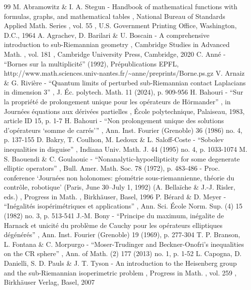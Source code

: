 \documentclass[11pt]{article}
\theoremstyle{definition}
\newcommand{\1}{\mathbbm{1}}
\numberwithin{equation}{section}
\begin{document}

\begin{thebibliography}{99}
 M. Abramowitz \& I. A. Stegun - Handbook of mathematical functions with formulas, graphs, and mathematical tables , National Bureau of Standards Applied Math. Series , vol. 55 , U.S. Government Printing Office, Washington, D.C., 1964
 A. Agrachev, D. Barilari \& U. Boscain - A comprehensive introduction to sub-Riemannian geometry , Cambridge Studies in Advanced Math. , vol. 181 , Cambridge University Press, Cambridge, 2020
 C. Anné - “Bornes sur la multiplicité” (1992), Prépublications EPFL, http://www.math.sciences.univ-nantes.fr/\textasciitilde{}anne/preprints/Borne.ps.gz
 V. Arnaiz \& G. Rivière - “Quantum limits of perturbed sub-Riemannian contact Laplacians in dimension 3” , J. Éc. polytech. Math. 11 (2024), p. 909-956
 H. Bahouri - “Sur la propriété de prolongement unique pour les opérateurs de Hörmander” , in Journées équations aux dérivées partielles , École polytechnique, Palaiseau, 1983, article ID 15, p. 1-7
 H. Bahouri - “Non prolongement unique des solutions d’opérateurs ‘somme de carrés’” , Ann. Inst. Fourier (Grenoble) 36 (1986) no. 4, p. 137-155
 D. Bakry, T. Coulhon, M. Ledoux \& L. Saloff-Coste - “Sobolev inequalities in disguise” , Indiana Univ. Math. J. 44 (1995) no. 4, p. 1033-1074
 M. S. Baouendi \& C. Goulaouic - “Nonanalytic-hypoellipticity for some degenerate elliptic operators” , Bull. Amer. Math. Soc. 78 (1972), p. 483-486
 - Proc. conference ‘Journées non holonomes: géométrie sous-riemannienne, théorie du contrôle, robotique’ (Paris, June 30–July 1, 1992) (A. Bellaïche \& J.-J. Risler, eds.) , Progress in Math. , Birkhäuser, Basel, 1996
 P. Bérard \& D. Meyer - “Inégalités isopérimétriques et applications” , Ann. Sci. École Norm. Sup. (4) 15 (1982) no. 3, p. 513-541
 J.-M. Bony - “Principe du maximum, inégalite de Harnack et unicité du problème de Cauchy pour les opérateurs elliptiques dégénérés” , Ann. Inst. Fourier (Grenoble) 19 (1969), p. 277-304
 T. P. Branson, L. Fontana \& C. Morpurgo - “Moser-Trudinger and Beckner-Onofri’s inequalities on the CR sphere” , Ann. of Math. (2) 177 (2013) no. 1, p. 1-52
 L. Capogna, D. Danielli, S. D. Pauls \& J. T. Tyson - An introduction to the Heisenberg group and the sub-Riemannian isoperimetric problem , Progress in Math. , vol. 259 , Birkhäuser Verlag, Basel, 2007

\end{thebibliography}
\end{document}
